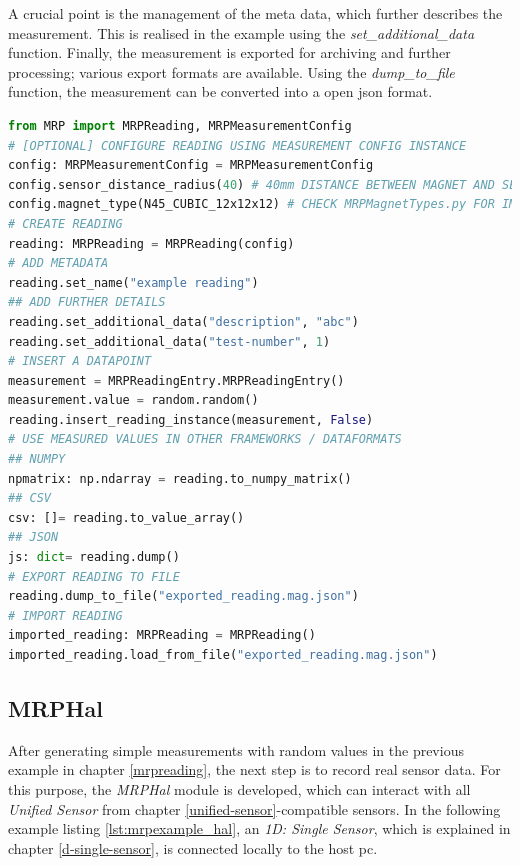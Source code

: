 A crucial point is the management of the meta data, which further
describes the measurement. This is realised in the example using the
\emph{set\_additional\_data} function. Finally, the measurement is
exported for archiving and further processing; various export formats
are available. Using the \emph{dump\_to\_file} function, the measurement
can be converted into a open \gls{json} format.

\newpage

\begin{lstlisting}[language=Python, caption={MRPReading example for setting up a basic measurement using Python code}, label=lst:mrpexample_reading]
from MRP import MRPReading, MRPMeasurementConfig
# [OPTIONAL] CONFIGURE READING USING MEASUREMENT CONFIG INSTANCE
config: MRPMeasurementConfig = MRPMeasurementConfig
config.sensor_distance_radius(40) # 40mm DISTANCE BETWEEN MAGNET AND SENSOR
config.magnet_type(N45_CUBIC_12x12x12) # CHECK MRPMagnetTypes.py FOR IMPLEMENTED TYPES
# CREATE READING
reading: MRPReading = MRPReading(config)
# ADD METADATA
reading.set_name("example reading")
## ADD FURTHER DETAILS
reading.set_additional_data("description", "abc")
reading.set_additional_data("test-number", 1)
# INSERT A DATAPOINT
measurement = MRPReadingEntry.MRPReadingEntry()
measurement.value = random.random()
reading.insert_reading_instance(measurement, False)
# USE MEASURED VALUES IN OTHER FRAMEWORKS / DATAFORMATS
## NUMPY
npmatrix: np.ndarray = reading.to_numpy_matrix()
## CSV
csv: []= reading.to_value_array()
## JSON
js: dict= reading.dump()
# EXPORT READING TO FILE
reading.dump_to_file("exported_reading.mag.json")
# IMPORT READING
imported_reading: MRPReading = MRPReading()
imported_reading.load_from_file("exported_reading.mag.json")
\end{lstlisting}

\hypertarget{mrphal}{%
\subsection{MRPHal}\label{mrphal}}

After generating simple measurements with random values in the previous
example in chapter \ref{mrpreading}, the next step is to record real
sensor data. For this purpose, the \emph{MRPHal} module is developed,
which can interact with all \emph{Unified Sensor} from chapter
\ref{unified-sensor}-compatible sensors. In the following example
listing \ref{lst:mrpexample_hal}, an \emph{1D: Single Sensor}, which is
explained in chapter \ref{d-single-sensor}, is connected locally to the
host \gls{pc}.

